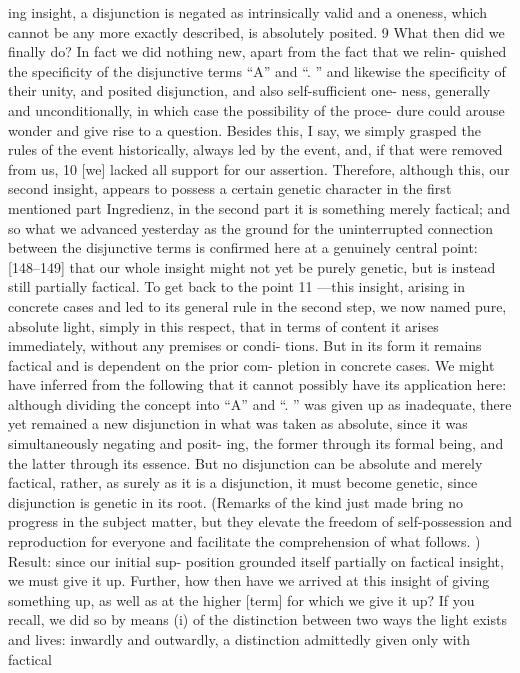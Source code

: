 ing insight, a disjunction is negated as intrinsically valid and a oneness, which
cannot be any more exactly described, is absolutely posited.
 9 What then did we
finally do? In fact we did nothing new, apart from the fact that we relin-
quished the specificity of the disjunctive terms “A” and “.
” and likewise the
specificity of their unity, and posited disjunction, and also self-sufficient one-
ness, generally and unconditionally, in which case the possibility of the proce-
dure could arouse wonder and give rise to a question.
 Besides this, I say, we
simply grasped the rules of the event historically, always led by the event, and,
if that were removed from us, 10 [we] lacked all support for our assertion.
Therefore, although this, our second insight, appears to possess a certain
genetic character in the first mentioned part {Ingredienz}, in the second part
it is something merely factical; and so what we advanced yesterday as the
ground for the uninterrupted connection between the disjunctive terms is
confirmed here at a genuinely central point: [148–149] that our whole insight
might not yet be purely genetic, but is instead still partially factical.
 To get back
to the point 11 —this insight, arising in concrete cases and led to its general rule
in the second step, we now named pure, absolute light, simply in this respect,
that in terms of content it arises immediately, without any premises or condi-
tions.
 But in its form it remains factical and is dependent on the prior com-
pletion in concrete cases.
 We might have inferred from the following that it
cannot possibly have its application here: although dividing the concept into
“A” and “.
” was given up as inadequate, there yet remained a new disjunction
in what was taken as absolute, since it was simultaneously negating and posit-
ing, the former through its formal being, and the latter through its essence.
But no disjunction can be absolute and merely factical, rather, as surely as it is
a disjunction, it must become genetic, since disjunction is genetic in its root.
(Remarks of the kind just made bring no progress in the subject matter, but
they elevate the freedom of self-possession and reproduction for everyone and
facilitate the comprehension of what follows.
) Result: since our initial sup-
position grounded itself partially on factical insight, we must give it up.
Further, how then have we arrived at this insight of giving something
up, as well as at the higher [term] for which we give it up? If you recall, we
did so by means (i) of the distinction between two ways the light exists and
lives: inwardly and outwardly, a distinction admittedly given only with factical
